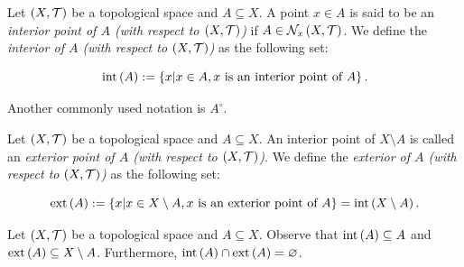 \begin{definition}
  Let $\left(X,\mathcal{T}\right)$ be a topological space and $A\subseteq X$. A point $x\in A$ is said to be an \emph{interior point of $A$ (with respect to $\left(X,\mathcal{T}\right)$)} if $A\in\mathcal{N}_x\left(X,\mathcal{T}\right)$. We define the \emph{interior of $A$ (with respect to $\left(X,\mathcal{T}\right)$)} as the following set:

  \begin{equation}
    \operatorname{int}\left(A\right):=\left\{x\middle|x\in A,x\text{ is an interior point of $A$}\right\}.
  \end{equation}

  Another commonly used notation is $A^\circ$.
\end{definition}

\begin{definition}
  Let $\left(X,\mathcal{T}\right)$ be a topological space and $A\subseteq X$. An interior point of $X\setminus A$ is called an \emph{exterior point of $A$ (with respect to $\left(X,\mathcal{T}\right)$)}. We define the \emph{exterior of $A$ (with respect to $\left(X,\mathcal{T}\right)$)} as the following set:

  \begin{equation}
    \operatorname{ext}\left(A\right):=\left\{x\middle|x\in X\setminus A,x\text{ is an exterior point of $A$}\right\}=\operatorname{int}\left(X\setminus A\right).
  \end{equation}
\end{definition}

\begin{remark}
  Let $\left(X,\mathcal{T}\right)$ be a topological space and $A\subseteq X$. Observe that $\operatorname{int}\left(A\right)\subseteq A$ and $\operatorname{ext}\left(A\right)\subseteq X\setminus A$. Furthermore, $\operatorname{int}\left(A\right)\cap\operatorname{ext}\left(A\right)=\varnothing$.
\end{remark}

